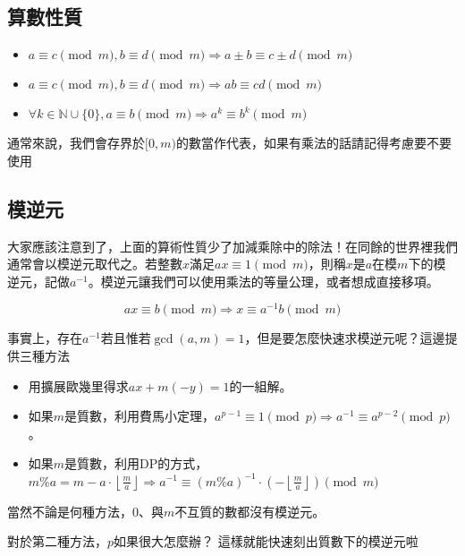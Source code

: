 \subsection{算數性質}
\begin{itemize}
\item $a \equiv c \pmod m, b \equiv d \pmod m \Rightarrow a \pm b \equiv c \pm d \pmod m$
\item $a \equiv c \pmod m, b \equiv d \pmod m \Rightarrow ab \equiv cd \pmod m$
\item $\forall k \in \mathbb{N} \cup \{0\}, a \equiv b \pmod m \Rightarrow a^k \equiv b^k \pmod m$
\end{itemize}
通常來說，我們會存界於$[0, m)$的數當作代表，如果有乘法的話請記得考慮要不要使用

\subsection{模逆元}
大家應該注意到了，上面的算術性質少了加減乘除中的除法！在同餘的世界裡我們通常會以模逆元取代之。若整數$x$滿足$ax \equiv 1 \pmod m$，則稱$x$是$a$在模$m$下的模逆元，記做$a^{-1}$。模逆元讓我們可以使用乘法的等量公理，或者想成直接移項。

$$
ax \equiv b \pmod m \Rightarrow x \equiv a^{-1}b \pmod m
$$

事實上，存在$a^{-1}$若且惟若$\gcd(a,m)=1$，但是要怎麼快速求模逆元呢？這邊提供三種方法
\begin{itemize}
\item 用擴展歐幾里得求$ax + m(-y) = 1$的一組解。
\item 如果$m$是質數，利用費馬小定理，$a^{p-1} \equiv 1 \pmod p \Rightarrow a^{-1} \equiv a^{p-2} \pmod p$。
\item 如果$m$是質數，利用DP的方式，\\ $m \% a = m - a \cdot \left \lfloor \frac{m}{a} \right \rfloor \Rightarrow a^{-1} \equiv (m \% a)^{-1} \cdot (- \left \lfloor \frac{m}{a} \right \rfloor) \pmod m$
\end{itemize}
當然不論是何種方法，$0$、與$m$不互質的數都沒有模逆元。

對於第二種方法，$p$如果很大怎麼辦？
這樣就能快速刻出質數下的模逆元啦

